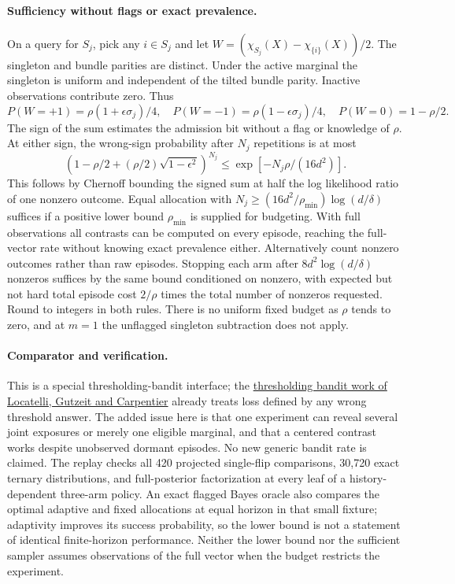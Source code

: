 \documentclass{article}
\begin{document}
\paragraph{Sufficiency without flags or exact prevalence.}
On a query for \(S_j\), pick any \(i\in S_j\) and let
\(W=(\chi_{S_j}(X)-\chi_{\{i\}}(X))/2\).
The singleton and bundle parities are distinct. Under the active
marginal the singleton is uniform and independent of the tilted
bundle parity. Inactive observations contribute zero. Thus
\[
 P(W=+1)=\rho(1+\epsilon\sigma_j)/4,\quad
 P(W=-1)=\rho(1-\epsilon\sigma_j)/4,\quad P(W=0)=1-\rho/2 .
\]
The sign of the sum estimates the admission bit without a flag
or knowledge of \(\rho\). At either sign, the wrong-sign
probability after \(N_j\) repetitions is at most
\[
 (1-\rho/2+(\rho/2)\sqrt{1-\epsilon^2})^{N_j}
 \le \exp[-N_j\rho/(16d^2)] .
\]
This follows by Chernoff bounding the signed sum at half the
log likelihood ratio of one nonzero outcome. Equal allocation
with \(N_j\ge(16d^2/\rho_{\min})\log(d/\delta)\) suffices
if a positive lower bound \(\rho_{\min}\) is supplied for
budgeting. With full observations all contrasts can be computed on
every episode, reaching the full-vector rate without knowing exact
prevalence either. Alternatively count nonzero outcomes rather than
raw episodes. Stopping each arm after
\(8d^2\log(d/\delta)\) nonzeros suffices by the same bound
conditioned on nonzero, with expected but not hard total
episode cost \(2/\rho\) times the total number of nonzeros
requested. Round to integers in both rules. There is no
uniform fixed budget as \(\rho\) tends to zero, and at \(m=1\)
the unflagged singleton subtraction does not apply.

\paragraph{Comparator and verification.}
This is a special thresholding-bandit interface; the
\href{https://proceedings.mlr.press/v48/locatelli16.pdf}{thresholding
bandit work of Locatelli, Gutzeit and Carpentier}
already treats loss defined by any wrong threshold answer.
The added issue here is that one experiment can reveal several
joint exposures or merely one eligible marginal, and that a
centered contrast works despite unobserved dormant episodes.
No new generic bandit rate is claimed.
The replay checks all 420 projected single-flip comparisons,
30,720 exact ternary distributions, and full-posterior
factorization at every leaf of a history-dependent three-arm
policy. An exact flagged Bayes oracle also compares the optimal
adaptive and fixed allocations at equal horizon in that small
fixture; adaptivity improves its success probability, so the
lower bound is not a statement of identical finite-horizon
performance. Neither the lower bound nor the sufficient
sampler assumes observations of the full vector when the
budget restricts the experiment.
\end{document}
